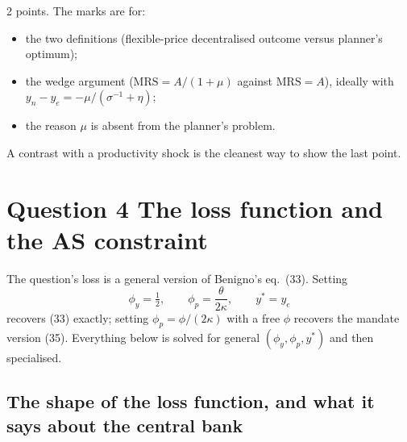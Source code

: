 \documentclass[11pt, a4paper]{article}
\newcommand{\MRS}{\mathrm{MRS}}
\begin{document}
\begin{tcolorbox}[rubricbox]
\small
2 points. The marks are for:
\begin{itemize}
\item the two definitions (flexible-price decentralised outcome versus planner's optimum);
\item the wedge argument ($\MRS=A/(1+\mu)$ against $\MRS=A$), ideally with
      $y_n-y_e=-\mu/(\sigma^{-1}+\eta)$;
\item the reason $\mu$ is absent from the planner's problem.
\end{itemize}
A contrast with a productivity shock is the cleanest way to show the last point.
\end{tcolorbox}

\section{Question 4 \quad The loss function and the AS constraint}

\begin{tcolorbox}[planbox, title={Map to Benigno's notation}]
\small
The question's loss is a general version of Benigno's eq.\ (33). Setting
\[
\phi_y=\tfrac12,\qquad \phi_p=\frac{\theta}{2\kappa},\qquad y^\ast=y_e
\]
recovers (33) exactly; setting $\phi_p=\phi/(2\kappa)$ with a free $\phi$ recovers the
mandate version (35). Everything below is solved for general $(\phi_y,\phi_p,y^\ast)$ and
then specialised.
\end{tcolorbox}

\subsection*{The shape of the loss function, and what it says about the central bank}
\end{document}
